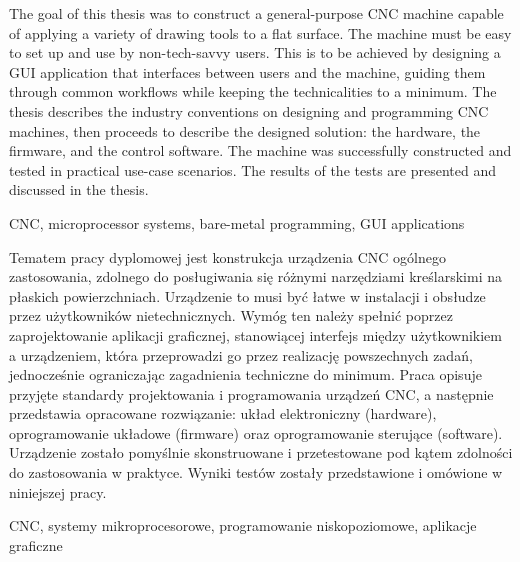 \abstract
The goal of this thesis was to construct a general-purpose CNC machine capable
of applying a variety of drawing tools to a flat surface. The machine
must be easy to set up and use by non-tech-savvy users. This is to be
achieved by designing a GUI application that interfaces between users and the
machine, guiding them through common workflows while keeping the technicalities
to a minimum. The thesis describes the industry conventions on designing and
programming CNC machines, then proceeds to describe the designed solution: the
hardware, the firmware, and the control software. The machine was successfully
constructed and tested in practical use-case scenarios. The results of the tests
are presented and discussed in the thesis.

\keywords CNC, microprocessor systems, bare-metal programming, GUI applications

\clearpage
\secondabstract
Tematem pracy dyplomowej jest konstrukcja urządzenia CNC ogólnego zastosowania,
zdolnego do posługiwania się różnymi narzędziami kreślarskimi na płaskich
powierzchniach. Urządzenie to musi być łatwe w instalacji i obsłudze przez
użytkowników nietechnicznych. Wymóg ten należy spełnić poprzez zaprojektowanie
aplikacji graficznej, stanowiącej interfejs między użytkownikiem a urządzeniem,
która przeprowadzi go przez realizację powszechnych zadań, jednocześnie
ograniczając zagadnienia techniczne do minimum. Praca opisuje przyjęte standardy
projektowania i programowania urządzeń CNC, a następnie przedstawia opracowane
rozwiązanie: układ elektroniczny (hardware), oprogramowanie układowe (firmware)
oraz oprogramowanie sterujące (software). Urządzenie zostało pomyślnie
skonstruowane i przetestowane pod kątem zdolności do zastosowania w praktyce.
Wyniki testów zostały przedstawione i omówione w niniejszej pracy.

\secondkeywords CNC, systemy mikroprocesorowe, programowanie niskopoziomowe,
aplikacje graficzne
